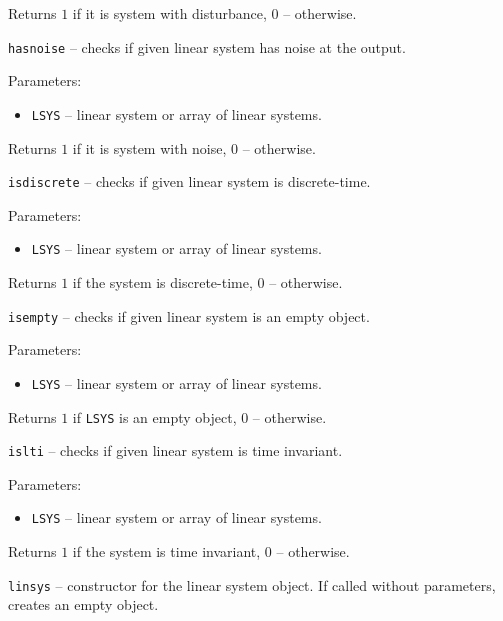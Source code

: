 Returns $1$ if it is system with disturbance, $0$ -- otherwise.

\newpage

{\Large {\tt hasnoise}} -- checks if given linear system has noise at the
output.

Parameters:
\begin{itemize}
\item {\tt LSYS} -- linear system or array of linear systems.
\end{itemize}

Returns $1$ if it is system with noise, $0$ -- otherwise.

\newpage

{\Large {\tt isdiscrete}} -- checks if given linear system is discrete-time.

Parameters:
\begin{itemize}
\item {\tt LSYS} -- linear system or array of linear systems.
\end{itemize}

Returns $1$ if the system is discrete-time, $0$ -- otherwise.

\newpage

{\Large {\tt isempty}} -- checks if given linear system is an empty object.

Parameters:
\begin{itemize}
\item {\tt LSYS} -- linear system or array of linear systems.
\end{itemize}

Returns $1$ if {\tt LSYS} is an empty object, $0$ -- otherwise.

\newpage

{\Large {\tt islti}} -- checks if given linear system is time invariant.

Parameters:
\begin{itemize}
\item {\tt LSYS} -- linear system or array of linear systems.
\end{itemize}

Returns $1$ if the system is time invariant, $0$ -- otherwise.

\newpage

{\Large {\tt linsys}} -- constructor for the linear system object.
If called without parameters, creates an empty object.

